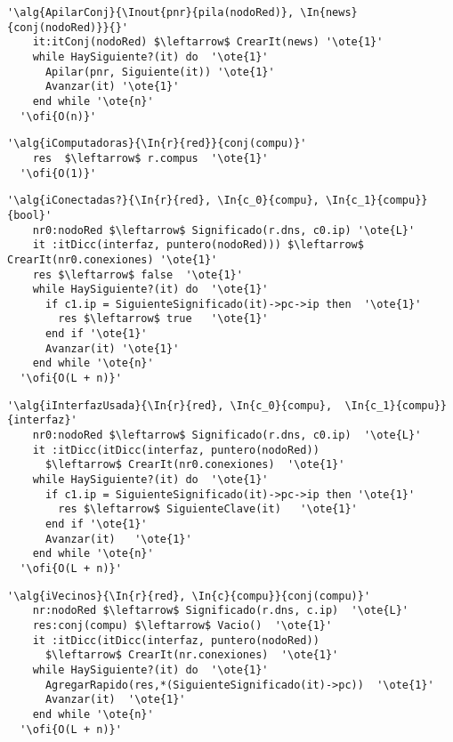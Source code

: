 \begin{lstlisting}[mathescape]
  '\alg{ApilarConj}{\Inout{pnr}{pila(nodoRed)}, \In{news}{conj(nodoRed)}}{}'
    it:itConj(nodoRed) $\leftarrow$ CrearIt(news) '\ote{1}'
    while HaySiguiente?(it) do  '\ote{1}'                                                   
      Apilar(pnr, Siguiente(it)) '\ote{1}'
      Avanzar(it) '\ote{1}'
    end while '\ote{n}'
  '\ofi{O(n)}'
\end{lstlisting}


\begin{lstlisting}[mathescape]
  '\alg{iComputadoras}{\In{r}{red}}{conj(compu)}'
    res  $\leftarrow$ r.compus  '\ote{1}'
  '\ofi{O(1)}'
\end{lstlisting}

\begin{lstlisting}[mathescape]
  '\alg{iConectadas?}{\In{r}{red}, \In{c_0}{compu}, \In{c_1}{compu}}{bool}'
    nr0:nodoRed $\leftarrow$ Significado(r.dns, c0.ip) '\ote{L}' 
    it :itDicc(interfaz, puntero(nodoRed))) $\leftarrow$ CrearIt(nr0.conexiones) '\ote{1}' 
    res $\leftarrow$ false  '\ote{1}'
    while HaySiguiente?(it) do  '\ote{1}'
      if c1.ip = SiguienteSignificado(it)->pc->ip then  '\ote{1}'
        res $\leftarrow$ true   '\ote{1}'
      end if '\ote{1}'
      Avanzar(it) '\ote{1}'
    end while '\ote{n}'
  '\ofi{O(L + n)}'
\end{lstlisting}

\begin{lstlisting}[mathescape]
  '\alg{iInterfazUsada}{\In{r}{red}, \In{c_0}{compu},  \In{c_1}{compu}}{interfaz}'
    nr0:nodoRed $\leftarrow$ Significado(r.dns, c0.ip)  '\ote{L}' 
    it :itDicc(itDicc(interfaz, puntero(nodoRed)) 
      $\leftarrow$ CrearIt(nr0.conexiones)  '\ote{1}' 
    while HaySiguiente?(it) do  '\ote{1}'  
      if c1.ip = SiguienteSignificado(it)->pc->ip then '\ote{1}'
        res $\leftarrow$ SiguienteClave(it)   '\ote{1}'
      end if '\ote{1}'
      Avanzar(it)   '\ote{1}'
    end while '\ote{n}'
  '\ofi{O(L + n)}'
\end{lstlisting}

\begin{lstlisting}[mathescape]
  '\alg{iVecinos}{\In{r}{red}, \In{c}{compu}}{conj(compu)}'
    nr:nodoRed $\leftarrow$ Significado(r.dns, c.ip)  '\ote{L}'
    res:conj(compu) $\leftarrow$ Vacio()  '\ote{1}'
    it :itDicc(itDicc(interfaz, puntero(nodoRed))  
      $\leftarrow$ CrearIt(nr.conexiones)  '\ote{1}'      
    while HaySiguiente?(it) do  '\ote{1}'
      AgregarRapido(res,*(SiguienteSignificado(it)->pc))  '\ote{1}'  
      Avanzar(it)  '\ote{1}'
    end while '\ote{n}'  
  '\ofi{O(L + n)}'
\end{lstlisting}

